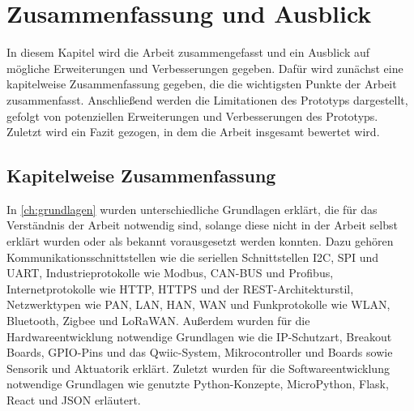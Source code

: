 \chapter{Zusammenfassung und Ausblick}\label{ch:zusammenfassung}
In diesem Kapitel wird die Arbeit zusammengefasst und ein Ausblick auf mögliche Erweiterungen und Verbesserungen gegeben.
Dafür wird zunächst eine kapitelweise Zusammenfassung gegeben, die die wichtigsten Punkte der Arbeit zusammenfasst.
Anschließend werden die Limitationen des Prototyps dargestellt, gefolgt von potenziellen Erweiterungen und Verbesserungen des Prototyps.
Zuletzt wird ein Fazit gezogen, in dem die Arbeit insgesamt bewertet wird.


\section{Kapitelweise Zusammenfassung}
In \cref{ch:grundlagen} wurden unterschiedliche Grundlagen erklärt, die für das Verständnis der Arbeit notwendig sind, solange diese nicht in der Arbeit selbst erklärt wurden oder als bekannt vorausgesetzt werden konnten.
Dazu gehören Kommunikationsschnittstellen wie die seriellen Schnittstellen I2C, SPI und UART, Industrieprotokolle wie Modbus, CAN-BUS und Profibus, Internetprotokolle wie HTTP, HTTPS und der REST-Architekturstil, Netzwerktypen wie PAN, LAN, HAN, WAN und Funkprotokolle wie WLAN, Bluetooth, Zigbee und LoRaWAN.
Außerdem wurden für die Hardwareentwicklung notwendige Grundlagen wie die IP-Schutzart, Breakout Boards, GPIO-Pins und das Qwiic-System, Mikrocontroller und Boards sowie Sensorik und Aktuatorik erklärt.
Zuletzt wurden für die Softwareentwicklung notwendige Grundlagen wie genutzte Python-Konzepte, MicroPython, Flask, React und JSON erläutert.

